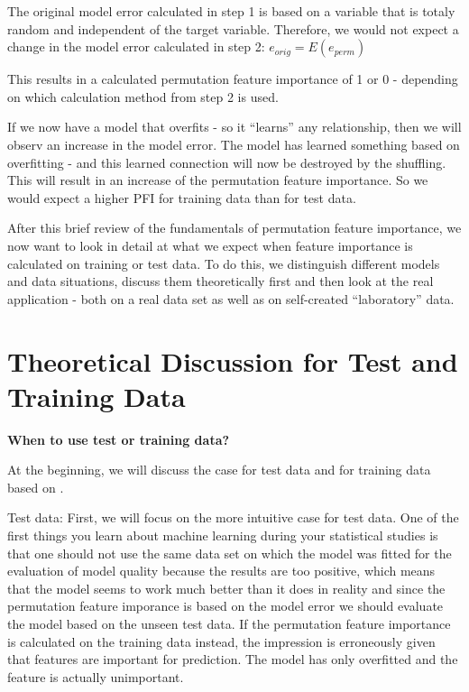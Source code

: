 \documentclass[
]{krantz}
\begin{document}
The original model error calculated in step 1 is based on a variable that is totaly random and independent of the target variable. Therefore, we would not expect a change in the model error calculated in step 2: \(e_{orig} = E(e_{perm})\)

This results in a calculated permutation feature importance of 1 or 0 - depending on which calculation method from step 2 is used.

If we now have a model that overfits - so it ``learns'' any relationship, then we will observ an increase in the model error. The model has learned something based on overfitting - and this learned connection will now be destroyed by the shuffling. This will result in an increase of the permutation feature importance. So we would expect a higher PFI for training data than for test data.

After this brief review of the fundamentals of permutation feature importance, we now want to look in detail at what we expect when feature importance is calculated on training or test data. To do this, we distinguish different models and data situations, discuss them theoretically first and then look at the real application - both on a real data set as well as on self-created ``laboratory'' data.

\hypertarget{theoretical-discussion-for-test-and-training-data}{%
\section{Theoretical Discussion for Test and Training Data}\label{theoretical-discussion-for-test-and-training-data}}

\textbf{When to use test or training data? }

At the beginning, we will discuss the case for test data and for training data based on \citet{molnar2019}.

Test data:
First, we will focus on the more intuitive case for test data. One of the first things you learn about machine learning during your statistical studies is that one should not use the same data set on which the model was fitted for the evaluation of model quality because the results are too positive, which means that the model seems to work much better than it does in reality and since the permutation feature imporance is based on the model error we should evaluate the model based on the unseen test data. If the permutation feature importance is calculated on the training data instead, the impression is erroneously given that features are important for prediction. The model has only overfitted and the feature is actually unimportant.
\end{document}
